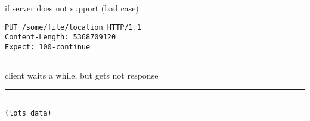 \begin{frame}[fragile]{if server does not support (bad case)}
\begin{Verbatim}[fontsize=\small]
PUT /some/file/location HTTP/1.1
Content-Length: 5368709120
Expect: 100-continue

\end{Verbatim}
\rule{0.9\textwidth}{1mm}
client waits a while, but gets not response
\rule{0.9\textwidth}{1mm}
\begin{Verbatim}[fontsize=\small]

(lots data)
\end{Verbatim}
\end{frame}

